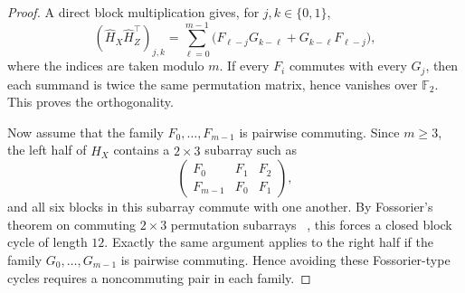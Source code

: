 \documentclass[11pt]{article}
\theoremstyle{uprightthm}
\begin{document}
\begin{proof}
A direct block multiplication gives, for $j,k\in\{0,1\}$,
\[
(\hat H_X\hat H_Z^\top)_{j,k}
=
\sum_{\ell=0}^{m-1}
\bigl(
F_{\ell-j}G_{k-\ell}+G_{k-\ell}F_{\ell-j}
\bigr),
\]
where the indices are taken modulo $m$. If every $F_i$ commutes with every
$G_j$, then each summand is twice the same permutation matrix, hence vanishes
over $\mathbb{F}_2$. This proves the orthogonality.

Now assume that the family $F_0,\dots,F_{m-1}$ is pairwise commuting. Since
$m\ge 3$, the left half of $\hat H_X$ contains a $2\times 3$ subarray such as
\[
\begin{pmatrix}
F_0 & F_1 & F_2\\
F_{m-1} & F_0 & F_1
\end{pmatrix},
\]
and all six blocks in this subarray commute with one another. By
Fossorier's theorem on commuting $2\times 3$ permutation subarrays
~\cite{Fossorier2004}, this forces a closed block cycle of length $12$.
Exactly the same argument applies to the right half if the family
$G_0,\dots,G_{m-1}$ is pairwise commuting. Hence avoiding these
Fossorier-type cycles requires a noncommuting pair in each family.
\end{proof}



\end{document}
